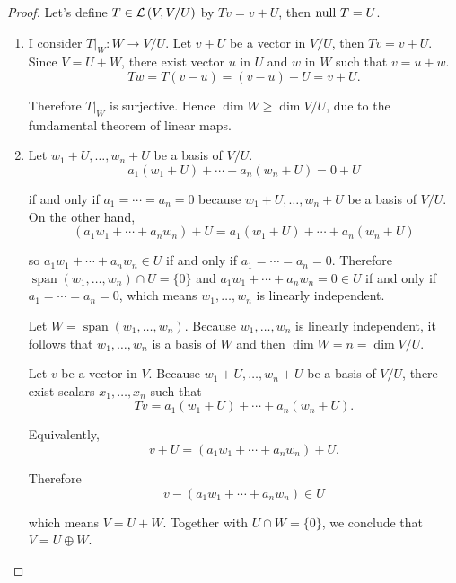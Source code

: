 \begin{proof}
    Let's define $T\in\mathcal{L}\left({V, V/U}\right)$ by $Tv = v + U$, then $\operatorname{null}\,{T} = U$.

    \begin{enumerate}[label={(\alph*)}]
        \item I consider $T\vert_{W}: W\to V/U$. Let $v + U$ be a vector in $V/U$, then $Tv = v + U$. Since $V = U + W$, there exist vector $u$ in $U$ and $w$ in $W$ such that $v = u + w$.
              \[
                  Tw = T(v - u) = (v - u) + U = v + U.
              \]

              Therefore $T\vert_{W}$ is surjective. Hence $\dim W\geq \dim V/U$, due to the fundamental theorem of linear maps.
        \item Let $w_{1} + U, \ldots, w_{n} + U$ be a basis of $V/U$.
              \[
                  a_{1}(w_{1} + U) + \cdots + a_{n}(w_{n} + U) = 0 + U
              \]

              if and only if $a_{1} = \cdots = a_{n} = 0$ because $w_{1} + U, \ldots, w_{n} + U$ be a basis of $V/U$. On the other hand,
              \[
                  (a_{1}w_{1} + \cdots + a_{n}w_{n}) + U = a_{1}(w_{1} + U) + \cdots + a_{n}(w_{n} + U)
              \]

              so $a_{1}w_{1} + \cdots + a_{n}w_{n}\in U$ if and only if $a_{1} = \cdots = a_{n} = 0$. Therefore $\operatorname{span}(w_{1}, \ldots, w_{n})\cap U = \{ 0 \}$  and $a_{1}w_{1} + \cdots + a_{n}w_{n} = 0\in U$ if and only if $a_{1} = \cdots = a_{n} = 0$, which means $w_{1}, \ldots, w_{n}$ is linearly independent.

              Let $W = \operatorname{span}(w_{1}, \ldots, w_{n})$. Because $w_{1}, \ldots, w_{n}$ is linearly independent, it follows that $w_{1}, \ldots, w_{n}$ is a basis of $W$ and then $\dim W = n = \dim V/U$.

              Let $v$ be a vector in $V$. Because $w_{1} + U, \ldots, w_{n} + U$ be a basis of $V/U$, there exist scalars $x_{1}, \ldots, x_{n}$ such that
              \[
                  Tv = a_{1}(w_{1} + U) + \cdots + a_{n}(w_{n} + U).
              \]

              Equivalently,
              \[
                  v + U = (a_{1}w_{1} + \cdots + a_{n}w_{n}) + U.
              \]

              Therefore
              \[
                  v - (a_{1}w_{1} + \cdots + a_{n}w_{n})\in U
              \]

              which means $V = U + W$. Together with $U\cap W = \{0\}$, we conclude that $V = U\oplus W$.\qedhere
    \end{enumerate}
\end{proof}
\newpage

